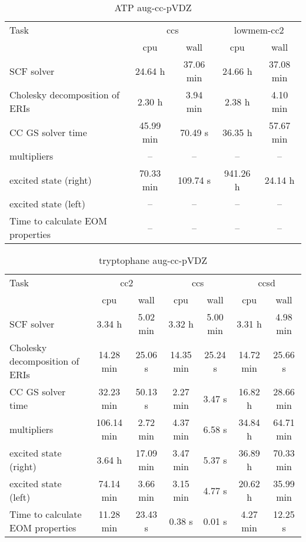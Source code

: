 \documentclass{article}
\begin{document}
\begin{table}
\caption{ATP aug-cc-pVDZ}
\begin{tabular}{lcccc}
\toprule
Task & \multicolumn{2}{c}{ccs} & \multicolumn{2}{c}{lowmem-cc2}\\
\cmidrule(lr){2-3}\cmidrule(lr){4-5}
 & cpu & wall & cpu & wall\\
\midrule
SCF solver & 24.64 h & 37.06 min & 24.66 h & 37.08 min\\
Cholesky decomposition of ERIs & 2.30 h & 3.94 min & 2.38 h & 4.10 min\\
CC GS solver time & 45.99 min & 70.49 s & 36.35 h & 57.67 min\\
multipliers & -- & -- & -- & --\\
excited state (right) & 70.33 min & 109.74 s & 941.26 h & 24.14 h\\
excited state (left) & -- & -- & -- & --\\
Time to calculate EOM properties & -- & -- & -- & --\\
\bottomrule
\end{tabular}
\end{table}
\begin{table}
\caption{tryptophane aug-cc-pVDZ}
\begin{tabular}{lcccccc}
\toprule
Task & \multicolumn{2}{c}{cc2} & \multicolumn{2}{c}{ccs} & \multicolumn{2}{c}{ccsd}\\
\cmidrule(lr){2-3}\cmidrule(lr){4-5}\cmidrule(lr){6-7}
 & cpu & wall & cpu & wall & cpu & wall\\
\midrule
SCF solver & 3.34 h & 5.02 min & 3.32 h & 5.00 min & 3.31 h & 4.98 min\\
Cholesky decomposition of ERIs & 14.28 min & 25.06 s & 14.35 min & 25.24 s & 14.72 min & 25.66 s\\
CC GS solver time & 32.23 min & 50.13 s & 2.27 min & 3.47 s & 16.82 h & 28.66 min\\
multipliers & 106.14 min & 2.72 min & 4.37 min & 6.58 s & 34.84 h & 64.71 min\\
excited state (right) & 3.64 h & 17.09 min & 3.47 min & 5.37 s & 36.89 h & 70.33 min\\
excited state (left) & 74.14 min & 3.66 min & 3.15 min & 4.77 s & 20.62 h & 35.99 min\\
Time to calculate EOM properties & 11.28 min & 23.43 s & 0.38 s & 0.01 s & 4.27 min & 12.25 s\\
\bottomrule
\end{tabular}
\end{table}
\end{document}

